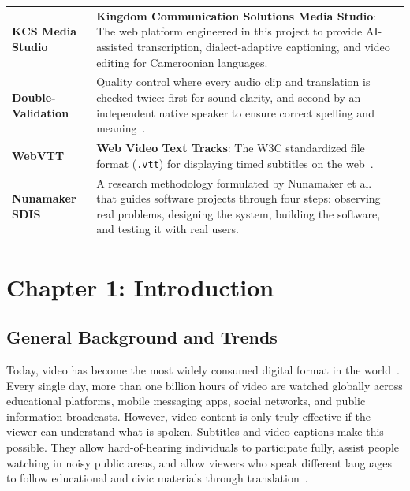 \documentclass[a4paper,11pt]{article}
\begin{document}
\begin{table}[h!]
\begin{tabular}{p{3.0cm} p{14.5cm}}
\addlinespace
\textbf{KCS Media Studio} & \textbf{Kingdom Communication Solutions Media Studio}: The web platform engineered in this project to provide AI-assisted transcription, dialect-adaptive captioning, and video editing for Cameroonian languages. \\
\addlinespace
\textbf{Double-Validation} & Quality control where every audio clip and translation is checked twice: first for sound clarity, and second by an independent native speaker to ensure correct spelling and meaning~\cite{bird2014coscab}. \\
\addlinespace
\textbf{WebVTT} & \textbf{Web Video Text Tracks}: The W3C standardized file format (\texttt{.vtt}) for displaying timed subtitles on the web~\cite{w3c2019webvtt}. \\
\addlinespace
\textbf{Nunamaker SDIS} & A research methodology formulated by Nunamaker et al.~\cite{nunamaker1990systems} that guides software projects through four steps: observing real problems, designing the system, building the software, and testing it with real users. \\
\bottomrule
\end{tabular}
\end{table}

\mainmatter

\section{Chapter 1: Introduction}
\label{sec:chap1_intro}

\subsection{General Background and Trends}
\label{sec:chap1_background}

Today, video has become the most widely consumed digital format in the world~\cite{mayer2020multimedia}. Every single day, more than one billion hours of video are watched globally across educational platforms, mobile messaging apps, social networks, and public information broadcasts. However, video content is only truly effective if the viewer can understand what is spoken. Subtitles and video captions make this possible. They allow hard-of-hearing individuals to participate fully, assist people watching in noisy public areas, and allow viewers who speak different languages to follow educational and civic materials through translation~\cite{vaswani2017attention, radford2023robust}.
\end{document}

